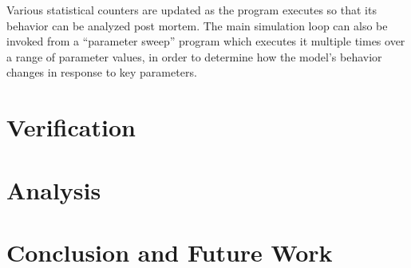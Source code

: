 \documentclass[sigconf]{acmart}
\begin{document}
Various statistical counters are updated as the program executes so that its behavior can be analyzed post mortem. The main simulation loop can also be invoked from a ``parameter sweep'' program which executes it multiple times over a range of parameter values, in order to determine how the model's behavior changes in response to key parameters.



\section{Verification}


\section{Analysis}


\section{Conclusion and Future Work}




\end{document}
